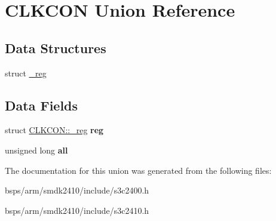 \hypertarget{unionCLKCON}{}\section{C\+L\+K\+C\+ON Union Reference}
\label{unionCLKCON}
\subsection*{Data Structures}
\begin{DoxyCompactItemize}
\item 
struct \mbox{\hyperlink{structCLKCON_1_1__reg}{\+\_\+reg}}
\end{DoxyCompactItemize}
\subsection*{Data Fields}
\begin{DoxyCompactItemize}
\item 
\mbox{\label{unionCLKCON_ac46c950b14468d102ca7896ec743daa2}} 
struct \mbox{\hyperlink{structCLKCON_1_1__reg}{C\+L\+K\+C\+O\+N\+::\+\_\+reg}} {\bfseries reg}
\item 
\mbox{\label{unionCLKCON_aab7486993bffd4d7d7811e6f3d4255a7}} 
unsigned long {\bfseries all}
\end{DoxyCompactItemize}


The documentation for this union was generated from the following files\+:\begin{DoxyCompactItemize}
\item 
bsps/arm/smdk2410/include/s3c2400.\+h\item 
bsps/arm/smdk2410/include/s3c2410.\+h\end{DoxyCompactItemize}

